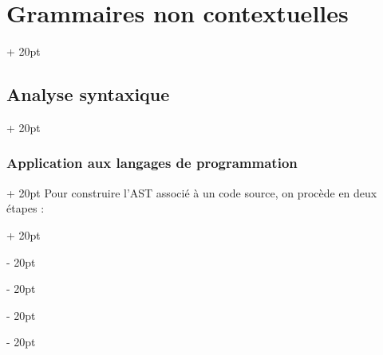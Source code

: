 \documentclass[a4paper, 12pt, twoside]{article}
\newcommand{\ind}[1][20pt]{\advance\leftskip + #1}
\newcommand{\deind}[1][20pt]{\advance\leftskip - #1}
\newenvironment{indt}[2][20pt]{#2 \par \ind[#1]}{\par \deind} %
\begin{document}
\begin{indt}{\section{Grammaires non contextuelles}}
\begin{indt}{\subsection{Analyse syntaxique}}
\begin{indt}{\subsubsection{Application aux langages de programmation}}
\begin{indt}{Pour construire l'AST associé à un code source, on procède en deux étapes :}








\end{indt}
\end{indt}
\end{indt}
\end{indt}
\end{document}
